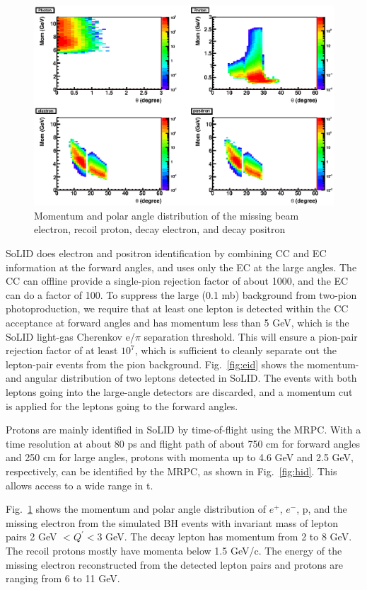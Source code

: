 \begin{figure}[t]
\includegraphics[width=125mm]{theta_mom_final.eps}
\caption{\small{Momentum and polar angle distribution of the missing
beam electron, recoil proton, decay electron, and decay positron}}
\label{fig:theta_mom}
\end{figure}

SoLID does electron and positron identification by combining CC and EC
information at the forward angles, and uses only the EC at the large angles.
The CC can offline provide a single-pion rejection factor of about 1000, and
the EC can do a factor of 100. To suppress the large (0.1 mb) background from
two-pion photoproduction, we require that at least one lepton is detected
within the CC acceptance at forward angles and has momentum less than 5 GeV,
which is the SoLID light-gas Cherenkov e/$\pi$ separation threshold. This will
ensure a pion-pair rejection factor of at least $10^7$, which is sufficient to
cleanly separate out the lepton-pair events from the pion background.
Fig.~\ref{fig:eid} shows the momentum- and angular distribution of two leptons
detected in SoLID. The events with both leptons going into the large-angle
detectors are discarded, and a momentum cut is applied for the leptons going
to the forward angles.

Protons are mainly identified in SoLID by time-of-flight using the MRPC. With
a time resolution at about 80 ps and flight path of about 750 cm for forward
angles and 250 cm for large angles, protons with momenta up to 4.6 GeV and 2.5
GeV, respectively, can be identified by the MRPC, as shown in
Fig.~\ref{fig:hid}. This allows access to a wide range in t.

Fig.~\ref{fig:theta_mom} shows the momentum and polar angle distribution
of $e^+$, $e^-$, p, and the missing electron from the simulated BH events
with invariant mass of lepton pairs 2 GeV $< Q^\prime < 3$ GeV. The decay
lepton has momentum from 2 to 8 GeV. The recoil protons mostly have momenta
below 1.5 GeV/c. The energy of the missing electron reconstructed from the
detected lepton pairs and protons are ranging from 6 to 11 GeV.

